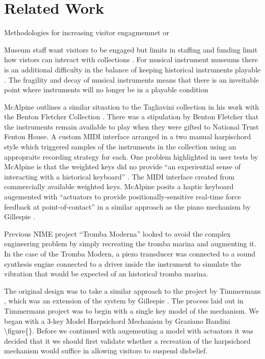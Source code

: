 \section{Related Work}\label{related-work}

Methodologies for increasing visitor engagmemnet or

Museum staff want visitors to be engaged but limits in staffing and
funding limit how vistors can interact with collections
\cite{Templeton2018,
McAlpine2014}. For musical instrument museums there is an additional
difficulty in the balance of keeping historical instruments playable
\cite{McAlpine2014}. The fragility and decay of musical instruments
means that there is an inveitable point where instruments will no longer
be in a playable condition \cite{McAlpine2014, Fritz2017}

McAlpine outlines a similar situation to the Tagliavini collection in
his work with the Benton Fletcher Collection \cite{McAlpine2014}. There
was a stipulation by Benton Fletcher that the instruments remain
available to play when they were gifted to National Trust Fenton House.
A custom MIDI interface arranged in a two manual harpischord style which
triggered samples of the instruments in the collection using an
appropraite recording strategy for each. One problem highlighted in user
tests by McAlpine is that the weighted keys did no provide ``an
experiential sense of interacting with a historical keyboard''
\cite{McAlpine2014}. The MIDI interface created from commercially
available weighted keys. McAlpine posits a haptic keyboard augemented
with ``actuators to provide positionally-sensitive real-time force
feedback at point-of-contact'' in a similar approach as the piano
mechanism by Gillespie \cite{Gillespie1996}.

Previous NIME project ``Tromba Moderna'' \cite{Baldwin2016} looked to
avoid the complex engineering problem by simply recreating the tromba
marina and augmenting it. In the case of the Tromba Modern, a piezo
transducer was connected to a sound synthesis engine connected to a
driver inside the instrument to simulate the vibration that would be
expected of an historical tromba marina.

The original design was to take a similar approach to the project by
Timmermans \cite{Timmermans2020}, which was an extension of the system
by Gillespie \cite{Gillespie1996}. The process laid out in Timmermans
project was to begin with a single key model of the mechanism. We began
with a 3-key Model Harpsichord Mechanism by Graziano Bandini
\textbackslash figure\{\}. Before we continued with augementing a model
with actuators it was decided that it we should first validate whether a
recreation of the harpsichord mechanism would suffice in allowing
visitors to suspend disbelief.

